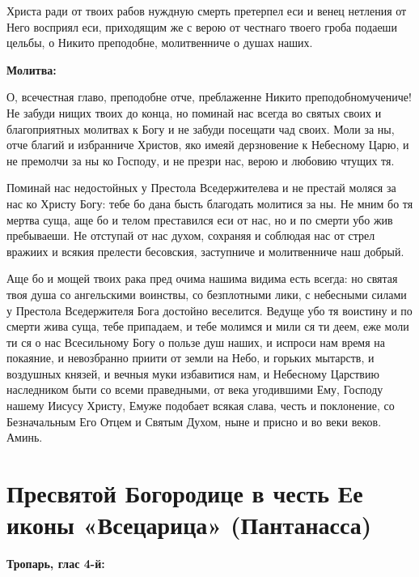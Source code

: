 Христа ради от твоих рабов нуждную смерть претерпел еси и венец нетления от Него восприял еси, приходящим же с верою от честнаго твоего гроба подаеши цельбы, о Никито преподобне, молитвенниче о душах наших.


\medskip


\bfseries Молитва:\normalfont{}\nopagebreak


О, всечестная главо, преподобне отче, преблаженне Никито преподобномучениче! Не забуди нищих твоих до конца, но поминай нас всегда во святых своих и благоприятных молитвах к Богу и не забуди посещати чад своих. Моли за ны, отче благий и избранниче Христов, яко имеяй дерзновение к Небесному Царю, и не премолчи за ны ко Господу, и не презри нас, верою и любовию чтущих тя. 

Поминай нас недостойных у Престола Вседержителева и не престай моляся за нас ко Христу Богу: тебе бо дана бысть благодать молитися за ны. Не мним бо тя мертва суща, аще бо и телом преставился еси от нас, но и по смерти убо жив пребываеши. Не отступай от нас духом, сохраняя и соблюдая нас от стрел вражиих и всякия прелести бесовския, заступниче и молитвенниче наш добрый. 

Аще бо и мощей твоих рака пред очима нашима видима есть всегда: но святая твоя душа со ангельскими воинствы, со безплотными лики, с небесными силами у Престола Вседержителя Бога достойно веселится. Ведуще убо тя воистину и по смерти жива суща, тебе припадаем, и тебе молимся и мили ся ти деем, еже моли ти ся о нас Всесильному Богу о пользе душ наших, и испроси нам время на покаяние, и невозбранно приити от земли на Небо, и горьких мытарств, и воздушных князей, и вечныя муки избавитися нам, и Небесному Царствию наследником быти со всеми праведными, от века угодившими Ему, Господу нашему Иисусу Христу, Емуже подобает всякая слава, честь и поклонение, со Безначальным Его Отцем и Святым Духом, ныне и присно и во веки веков. Аминь.
\nopagebreak\bigskip\bigskip\mychapterending


 

\section{Пресвятой Богородице в честь Ее иконы «Всецарица» (Пантанасса)}
 


\bfseries Тропарь, глас 4-й:\normalfont{}\nopagebreak


